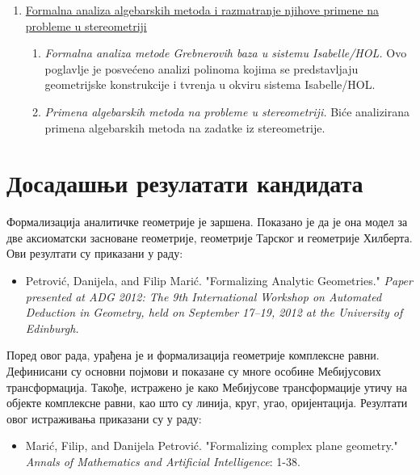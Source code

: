 \documentclass{article}
\begin{document}
\begin{enumerate}
\item \underline{Formalna analiza algebarskih metoda i razmatranje njihove primene na probleme u stereometriji}
      \begin{enumerate}[label*=\arabic*.]
      \item {\em Formalna analiza metode Grebnerovih baza u sistemu {\lat Isabelle/HOL}.} Ovo poglavlje je posve\'ceno analizi polinoma kojima se predstavljaju geometrijske
            konstrukcije i tvr\dj enja u okviru sistema {\lat Isabelle/HOL}.
      \item {\em Primena algebarskih metoda na probleme u stereometriji.} Bi\'ce analizirana primena algebarskih metoda na zadatke iz stereometrije.
      \end{enumerate}
\end{enumerate}


\section{Досадашњи резулатати кандидата}

Формализација аналитичке геометрије је заршена. Показано је да је она модел
за две аксиоматски засноване геометрије, геометрије Тарског и геометрије 
Хилберта. Ови резултати су приказани у раду:
\begin{itemize}
\item {\lat Petrovi\'c, Danijela, and Filip Mari\'c. "Formalizing Analytic Geometries." {\em Paper presented at ADG 2012: The 9th International Workshop on Automated Deduction in Geometry, held on September 17--19, 2012 at the University of Edinburgh.}}
\end{itemize}

Поред овог рада, урађена је и формализација геометрије комплексне
равни. Дефинисани су основни појмови и показане су многе особине
Мебијусових трансформација. Такође, истражено је како Мебијусове
трансформације утичу на објекте комплексне равни, као што су линија,
круг, угао, оријентација. Резултати овог истраживања приказани су у
раду:
\begin{itemize}
\item {\lat Mari\' c, Filip, and Danijela Petrovi\' c. "Formalizing complex plane geometry." {\em Annals of Mathematics and Artificial Intelligence}: 1-38.}
\end{itemize}
\end{document}
